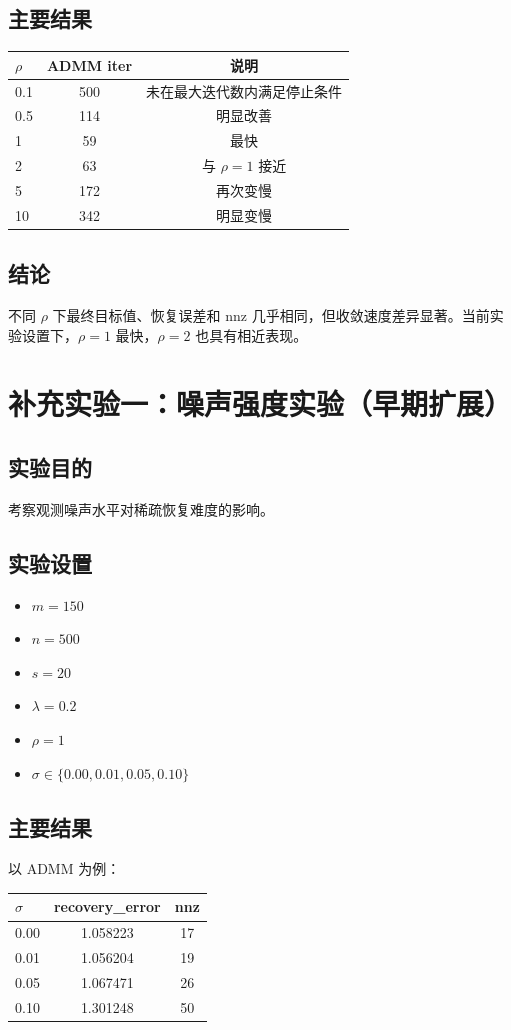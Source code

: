 \documentclass[12pt,a4paper]{ctexart}
\begin{document}
\subsection{主要结果}
\begin{center}
\begin{tabular}{lcc}
\toprule
$\rho$ & ADMM iter & 说明 \\
\midrule
0.1 & 500 & 未在最大迭代数内满足停止条件 \\
0.5 & 114 & 明显改善 \\
1 & 59 & 最快 \\
2 & 63 & 与 $\rho=1$ 接近 \\
5 & 172 & 再次变慢 \\
10 & 342 & 明显变慢 \\
\bottomrule
\end{tabular}
\end{center}

\subsection{结论}
不同 $\rho$ 下最终目标值、恢复误差和 nnz 几乎相同，但收敛速度差异显著。当前实验设置下，$\rho=1$ 最快，$\rho=2$ 也具有相近表现。

\section{补充实验一：噪声强度实验（早期扩展）}
\subsection{实验目的}
考察观测噪声水平对稀疏恢复难度的影响。

\subsection{实验设置}
\begin{itemize}[leftmargin=2em]
    \item $m=150$
    \item $n=500$
    \item $s=20$
    \item $\lambda=0.2$
    \item $\rho=1$
    \item $\sigma \in \{0.00, 0.01, 0.05, 0.10\}$
\end{itemize}

\subsection{主要结果}
以 ADMM 为例：
\begin{center}
\begin{tabular}{lcc}
\toprule
$\sigma$ & recovery\_error & nnz \\
\midrule
0.00 & 1.058223 & 17 \\
0.01 & 1.056204 & 19 \\
0.05 & 1.067471 & 26 \\
0.10 & 1.301248 & 50 \\
\bottomrule
\end{tabular}
\end{center}
\end{document}
